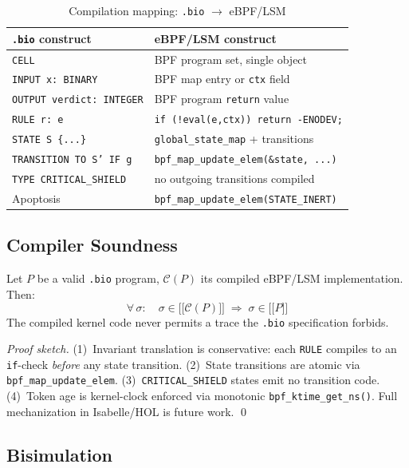 \documentclass[11pt,a4paper,twoside]{article}
\newcommand{\sem}[1]{\mathopen{[\![}#1\mathclose{]\!]}}
\begin{document}
\begin{table}[H]
\centering
\caption{Compilation mapping: \texttt{.bio} $\to$ eBPF/LSM}
\begin{tabular}{@{}ll@{}}
\toprule
\textbf{\texttt{.bio} construct} & \textbf{eBPF/LSM construct} \\ \midrule
\texttt{CELL} & BPF program set, single object \\
\texttt{INPUT x: BINARY} & BPF map entry or \texttt{ctx} field \\
\texttt{OUTPUT verdict: INTEGER} & BPF program \texttt{return} value \\
\texttt{RULE r: e} & \texttt{if (!eval(e,ctx)) return -ENODEV;} \\
\texttt{STATE S \{...\}} & \texttt{global\_state\_map} + transitions \\
\texttt{TRANSITION TO S' IF g} & \texttt{bpf\_map\_update\_elem(\&state, ...)} \\
\texttt{TYPE CRITICAL\_SHIELD} & no outgoing transitions compiled \\
Apoptosis & \texttt{bpf\_map\_update\_elem(STATE\_INERT)} \\
\bottomrule
\end{tabular}
\end{table}

\subsection{Compiler Soundness}

\begin{theorem}\label{thm:soundness}
Let $P$ be a valid \texttt{.bio} program, $\mathcal{C}(P)$ its compiled eBPF/LSM
implementation. Then:
\[
  \forall\,\sigma:\quad \sigma \in \sem{\mathcal{C}(P)} \;\Longrightarrow\; \sigma \in \sem{P}
\]
The compiled kernel code never permits a trace the \texttt{.bio} specification forbids.
\end{theorem}
\begin{proof}[Proof sketch]
(1)~Invariant translation is conservative: each \texttt{RULE} compiles to an
\texttt{if}-check \emph{before} any state transition.
(2)~State transitions are atomic via \texttt{bpf\_map\_update\_elem}.
(3)~\texttt{CRITICAL\_SHIELD} states emit no transition code.
(4)~Token age is kernel-clock enforced via monotonic \texttt{bpf\_ktime\_get\_ns()}.
Full mechanization in Isabelle/HOL is future work. \qed
\end{proof}

\subsection{Bisimulation}
\end{document}
